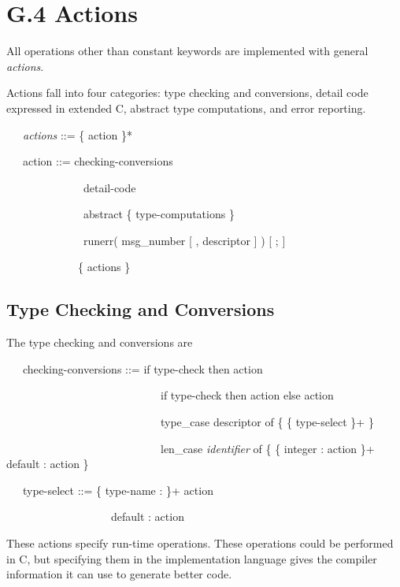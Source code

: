 \section{G.4 Actions }

All operations other than constant keywords are implemented with
general \textit{actions}.

Actions fall into four categories: type checking and conversions,
detail code expressed in extended C, abstract type computations, and
error reporting.

{\ttfamily\mdseries
\ \ \ \textit{actions} ::= \{ action \}*}

{\ttfamily\mdseries
\ \ \ action ::= checking-conversions {\textbar}}

{\ttfamily\mdseries
\ \ \ \ \ \ \ \ \ \ \ \ \ \ detail-code {\textbar}}

{\ttfamily\mdseries
\ \ \ \ \ \ \ \ \ \ \ \ \ \ abstract \{ type-computations \} {\textbar}}

{\ttfamily\mdseries
\ \ \ \ \ \ \ \ \ \ \ \ \ \ runerr( msg\_number [ , descriptor ] ) [ ; ]}

{\ttfamily\mdseries
\ \ \ \ \ \ \ \ \ \ \ \ \ \{ actions \}}

\subsection{Type Checking and Conversions}

The type checking and conversions are 

{\ttfamily\mdseries
\ \ \ checking-conversions ::= if type-check then action {\textbar}}

{\ttfamily\mdseries
\ \ \ \ \ \ \ \ \ \ \ \ \ \ \ \ \ \ \ \ \ \ \ \ \ \ \ \ if type-check then action else action {\textbar}}

{\ttfamily\mdseries
\ \ \ \ \ \ \ \ \ \ \ \ \ \ \ \ \ \ \ \ \ \ \ \ \ \ \ \ type\_case descriptor of \{ \{ type-select \}+ \} {\textbar}}

{\ttfamily\mdseries
\ \ \ \ \ \ \ \ \ \ \ \ \ \ \ \ \ \ \ \ \ \ \ \ \ \ \ \ len\_case \textit{identifier} of \{ \{ integer : action \}+
default : action \}}

{\ttfamily\mdseries
\ \ \ type-select ::= \{ type-name : \}+ action {\textbar}}

{\ttfamily\mdseries
\ \ \ \ \ \ \ \ \ \ \ \ \ \ \ \ \ \ \ default : action}


These actions specify run-time operations. These operations could be
performed in C, but specifying them in the implementation language
gives the compiler information it can use to generate better code.

